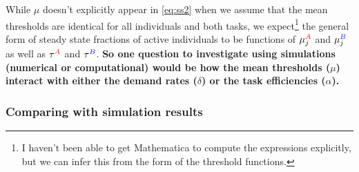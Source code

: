\documentclass[10pt]{article}
\theoremstyle{remark}
\newcommand{\A}{{\color{red}A}}
\newcommand{\B}{{\color{blue}B}}
\begin{document}
While $\mu$ doesn't explicitly appear in \eqref{eq:ss2} when we assume that the mean thresholds are identical for all individuals and both tasks, we expect\footnote{I haven't been able to get Mathematica to compute the expressions explicitly, but we can infer this from the form of the threshold functions.} the general form of steady state fractions of active individuals to be functions of $\mu_j^{\A}$ and $\mu_j^{\B}$ as well as $\tau^{\A}$ and $\tau^{\B}$. \textbf{So one question to investigate using simulations (numerical or computational) would be \textbf{how the mean thresholds ($\mu$) interact with either the demand rates ($\delta$) or the task efficiencies ($\alpha$)}.}

\subsubsection{Comparing with simulation results}
\end{document}
